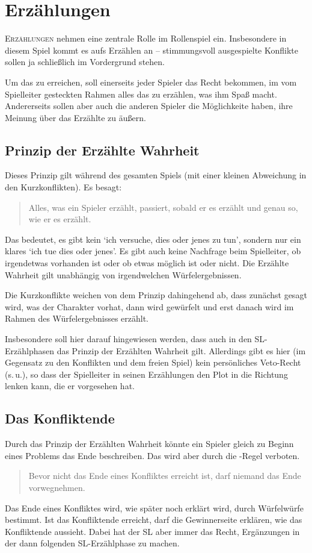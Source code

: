 \chapter{Erzählungen}\label{Ch:Erzaehlungen}
\lettrine[findent=0.3em,nindent=0.2em]{E}{rzählungen} nehmen eine zentrale Rolle im Rollenspiel ein. Insbesondere in diesem Spiel kommt es aufs Erzählen an -- stimmungsvoll ausgespielte Konflikte sollen ja schließlich im Vordergrund stehen.

Um das zu erreichen, soll einerseits jeder Spieler das Recht bekommen, im vom Spielleiter gesteckten Rahmen alles das zu erzählen, was ihm Spaß macht. Andererseits sollen aber auch die anderen Spieler die Möglichkeite haben, ihre Meinung über das Erzählte zu äußern.

\section{Prinzip der Erzählte Wahrheit}
Dieses Prinzip gilt während des gesamten Spiels (mit einer kleinen Abweichung in den Kurzkonflikten). Es besagt:
\begin{quote}
Alles, was ein Spieler erzählt, passiert, sobald er es erzählt und genau so, wie er es erzählt.
\end{quote}

Das bedeutet, es gibt kein `ich versuche, dies oder jenes zu tun', sondern nur ein klares `ich tue dies oder jenes'. Es gibt auch keine Nachfrage beim Spielleiter, ob irgendetwas vorhanden ist oder ob etwas möglich ist oder nicht. Die Erzählte Wahrheit gilt unabhängig von irgendwelchen Würfelergebnissen.

Die Kurzkonflikte weichen von dem Prinzip dahingehend ab, dass zunächst gesagt wird, was der Charakter vorhat, dann wird gewürfelt und erst danach wird im Rahmen des Würfelergebnisses erzählt.

Insbesondere soll hier darauf hingewiesen werden, dass auch in den SL-Erzählphasen das Prinzip der Erzählten Wahrheit gilt. Allerdings gibt es hier (im Gegensatz zu den Konflikten und dem freien Spiel) kein persönliches Veto-Recht (s.\,u.), so dass der Spielleiter in seinen Erzählungen den Plot in die Richtung lenken kann, die er vorgesehen hat.

\section{Das Konfliktende}
Durch das Prinzip der Erzählten Wahrheit könnte ein Spieler gleich zu Beginn eines Problems das Ende beschreiben. Das wird aber durch die -Regel verboten.
\begin{quote}
  Bevor nicht das Ende eines Konfliktes erreicht ist, darf niemand das Ende vorwegnehmen.
\end{quote}
Das Ende eines Konfliktes wird, wie später noch erklärt wird, durch Würfelwürfe bestimmt. Ist das Konfliktende erreicht, darf die Gewinnerseite erklären, wie das Konfliktende aussieht. Dabei hat der SL aber immer das Recht, Ergänzungen in der dann folgenden SL-Erzählphase zu machen.


